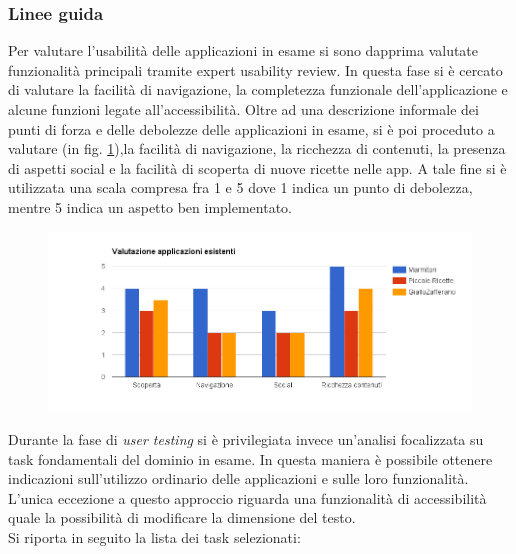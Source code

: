 \subsubsection{Linee guida}
Per valutare l'usabilità delle applicazioni in esame si sono dapprima valutate
funzionalità principali tramite expert usability review.  In questa fase si è
cercato di valutare la facilità di navigazione, la completezza funzionale
dell'applicazione e alcune funzioni legate all'accessibilità. 
Oltre ad una descrizione informale dei punti di forza e delle debolezze delle applicazioni in esame,
si è poi proceduto a valutare (in fig. \ref{fig:valutazionelineeguida}),la facilità di navigazione, la ricchezza
di contenuti, la presenza di aspetti social e la facilità di scoperta di nuove ricette nelle app.
A tale fine si è utilizzata una scala compresa fra 1 e 5 dove 1 indica un punto di debolezza, mentre
5 indica un aspetto ben implementato.\\
\begin{figure}[H]
 \centering
 \includegraphics[width=\textwidth]{img/valutazionelineeguida}
 \label{fig:valutazionelineeguida}
\end{figure}
Durante la fase
di \emph{user testing} si è privilegiata invece un'analisi focalizzata su task
fondamentali del dominio in esame.  In questa maniera è possibile ottenere
indicazioni sull'utilizzo ordinario delle applicazioni e sulle loro
funzionalità.  L'unica eccezione a questo approccio riguarda una funzionalità di
accessibilità quale la possibilità di modificare la dimensione del testo.\\
Si riporta in seguito la lista dei task selezionati:

